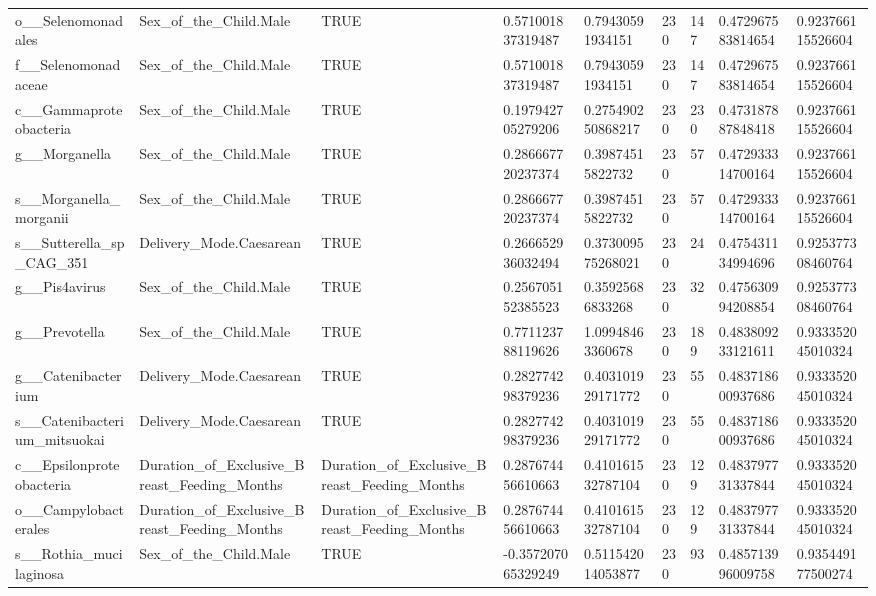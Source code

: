 \begin{longtable}{lllllllll}
o\_\_Selenomonadales & Sex\_of\_the\_Child.Male & TRUE & 0.571001837319487 & 0.79430591934151 & 230 & 147 & 0.472967583814654 & 0.923766115526604 \\
f\_\_Selenomonadaceae & Sex\_of\_the\_Child.Male & TRUE & 0.571001837319487 & 0.79430591934151 & 230 & 147 & 0.472967583814654 & 0.923766115526604 \\
c\_\_Gammaproteobacteria & Sex\_of\_the\_Child.Male & TRUE & 0.197942705279206 & 0.275490250868217 & 230 & 230 & 0.473187887848418 & 0.923766115526604 \\
g\_\_Morganella & Sex\_of\_the\_Child.Male & TRUE & 0.286667720237374 & 0.39874515822732 & 230 & 57 & 0.472933314700164 & 0.923766115526604 \\
s\_\_Morganella\_morganii & Sex\_of\_the\_Child.Male & TRUE & 0.286667720237374 & 0.39874515822732 & 230 & 57 & 0.472933314700164 & 0.923766115526604 \\
s\_\_Sutterella\_sp\_CAG\_351 & Delivery\_Mode.Caesarean & TRUE & 0.266652936032494 & 0.373009575268021 & 230 & 24 & 0.475431134994696 & 0.925377308460764 \\
g\_\_Pis4avirus & Sex\_of\_the\_Child.Male & TRUE & 0.256705152385523 & 0.35925686833268 & 230 & 32 & 0.475630994208854 & 0.925377308460764 \\
g\_\_Prevotella & Sex\_of\_the\_Child.Male & TRUE & 0.771123788119626 & 1.09948463360678 & 230 & 189 & 0.483809233121611 & 0.933352045010324 \\
g\_\_Catenibacterium & Delivery\_Mode.Caesarean & TRUE & 0.282774298379236 & 0.403101929171772 & 230 & 55 & 0.483718600937686 & 0.933352045010324 \\
s\_\_Catenibacterium\_mitsuokai & Delivery\_Mode.Caesarean & TRUE & 0.282774298379236 & 0.403101929171772 & 230 & 55 & 0.483718600937686 & 0.933352045010324 \\
c\_\_Epsilonproteobacteria & Duration\_of\_Exclusive\_Breast\_Feeding\_Months & Duration\_of\_Exclusive\_Breast\_Feeding\_Months & 0.287674456610663 & 0.410161532787104 & 230 & 129 & 0.483797731337844 & 0.933352045010324 \\
o\_\_Campylobacterales & Duration\_of\_Exclusive\_Breast\_Feeding\_Months & Duration\_of\_Exclusive\_Breast\_Feeding\_Months & 0.287674456610663 & 0.410161532787104 & 230 & 129 & 0.483797731337844 & 0.933352045010324 \\
s\_\_Rothia\_mucilaginosa & Sex\_of\_the\_Child.Male & TRUE & -0.357207065329249 & 0.511542014053877 & 230 & 93 & 0.485713996009758 & 0.935449177500274 \\

\end{longtable}
